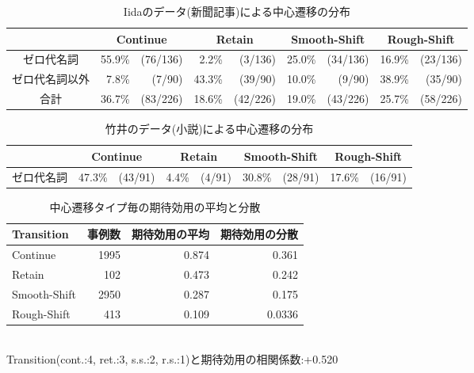 \begin{table}
\begin{center}
\begin{tabular}{|c||rr|rr|rr|rr|}
\hline
&\multicolumn{2}{|c|}{Continue}&\multicolumn{2}{|c|}{Retain}&\multicolumn{2}{|c|}{Smooth-Shift}&\multicolumn{2}{|c|}{Rough-Shift}\\
\hline\hline
ゼロ代名詞&55.9\%&(76/136)&2.2\%&(3/136)&25.0\%&(34/136)&16.9\%&(23/136)\\
\hline
ゼロ代名詞以外&7.8\%&(7/90)&43.3\%&(39/90)&10.0\%&(9/90)&38.9\%&(35/90)\\
\hline\hline
合計&36.7\%&(83/226)&18.6\%&(42/226)&19.0\%&(43/226)&25.7\%&(58/226)\\
\hline
\end{tabular}
\end{center}
\caption{Iidaのデータ(新聞記事)による中心遷移の分布}
\label{tab:iida_tran}
\end{table}

\begin{table}
\begin{center}
\begin{tabular}{|c||rr|rr|rr|rr|}
\hline
&\multicolumn{2}{|c|}{Continue}&\multicolumn{2}{|c|}{Retain}&\multicolumn{2}{|c|}{Smooth-Shift}&\multicolumn{2}{|c|}{Rough-Shift}\\
\hline\hline
ゼロ代名詞&47.3\%&(43/91)&4.4\%&(4/91)&30.8\%&(28/91)&17.6\%&(16/91)\\
\hline
\end{tabular}
\end{center}
\caption{竹井のデータ(小説)による中心遷移の分布}
\label{tab:takei_tran}
\end{table}


\begin{table}
\begin{center}
\begin{tabular}{|l||r|r|r|}
\hline
Transition&事例数&期待効用の平均&期待効用の分散\\
\hline\hline
Continue&1995&0.874&0.361\phantom{0}\\
Retain&102&0.473&0.242\phantom{0}\\
Smooth-Shift&2950&0.287&0.175\phantom{0}\\
Rough-Shift&413&0.109&0.0336\\
\hline
\end{tabular}\\
Transition(cont.:4, ret.:3, s.s.:2, r.s.:1)と期待効用の相関係数:+0.520\\
\end{center}
\caption{中心遷移タイプ毎の期待効用の平均と分散}
\label{tab:tran_exputil}
\end{table}


